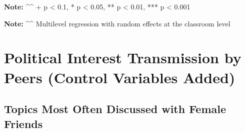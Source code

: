\documentclass[
  letterpaper,
  DIV=11,
  numbers=noendperiod]{scrreprt}
\begin{document}
\textbf{Note:} \^{}\^{} + p \textless{} 0.1, * p \textless{} 0.05, ** p
\textless{} 0.01, *** p \textless{} 0.001

\textbf{Note:} \^{}\^{} Multilevel regression with random effects at the
classroom level

\hypertarget{sec-appendix6}{%
\chapter{Political Interest Transmission by Peers (Control Variables
Added)}\label{sec-appendix6}}

\hypertarget{topics-most-often-discussed-with-female-friends-1}{%
\section{Topics Most Often Discussed with Female
Friends}\label{topics-most-often-discussed-with-female-friends-1}}
\end{document}

